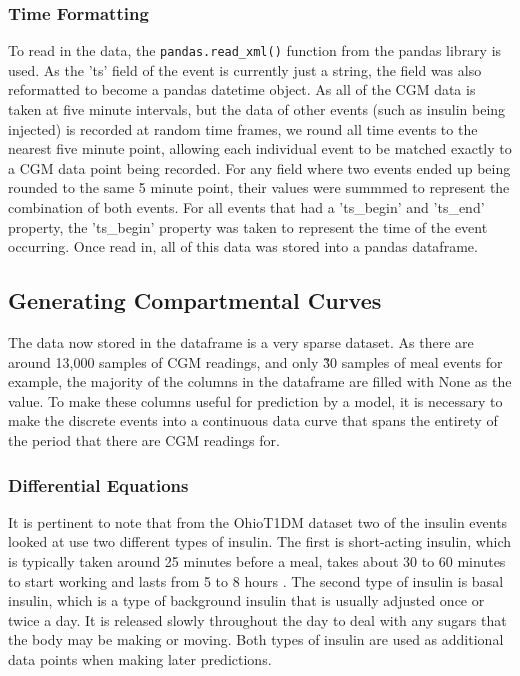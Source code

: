         \subsubsection{Time Formatting}
          To read in the data, the \Verb+pandas.read_xml()+ function from the  pandas library is used. As the 'ts' field of the event is currently just a string, the field was also reformatted to become a pandas datetime object. As all of the CGM data is taken at five minute intervals, but the data of other events (such as insulin being injected) is recorded at random time frames, we round all time events to the nearest five minute point, allowing each individual event to be matched exactly to a CGM data point being recorded. For any field where two events ended up being rounded to the same 5 minute point, their values were summmed to represent the combination of both events. For all events that had a 'ts\_begin' and 'ts\_end' property, the 'ts\_begin' property was taken to represent the time of the event occurring. Once read in, all of this data was stored into a pandas dataframe.

      \subsection{Generating Compartmental Curves}
          The data now stored in the dataframe is a very sparse dataset. As there are around 13,000 samples of CGM readings, and only \~30 samples of meal events for example, the majority of the columns in the dataframe are filled with None as the value. To make these columns useful for prediction by a model, it is necessary to make the discrete events into a continuous data curve that spans the entirety of the period that there are CGM readings for.

          \subsubsection{Differential Equations}
          It is pertinent to note that from the OhioT1DM dataset two of the insulin events looked at use two different types of insulin. The first is short-acting insulin, which is typically taken around 25 minutes before a meal, takes about 30 to 60 minutes to start working and lasts from 5 to 8 hours \cite{basalshort}. The second type of insulin is basal insulin, which is a type of background insulin that is usually adjusted once or twice a day. It is released slowly throughout the day to deal with any sugars that the body may be making or moving. Both types of insulin are used as additional data points when making later predictions.

